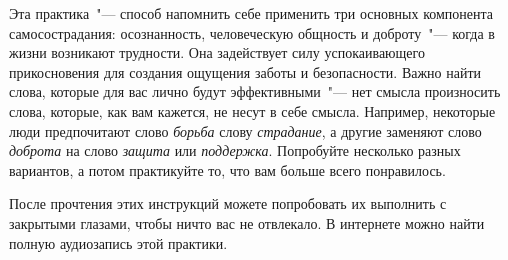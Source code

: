 \newpage
{} \label{IP:Self-Compassion_Break}

Эта практика~"--- способ напомнить себе применить три основных компонента самосострадания: осознанность, человеческую общность и доброту~"--- когда в жизни возникают трудности. Она задействует силу успокаивающего прикосновения для создания ощущения заботы и безопасности. Важно найти слова, которые для вас лично будут эффективными~"--- нет смысла произносить слова, которые, как вам кажется, не несут в себе смысла. Например, некоторые люди предпочитают слово \textit{борьба} слову \textit{страдание}, а другие заменяют слово \textit{доброта} на слово \textit{защита} или \textit{поддержка}. Попробуйте несколько разных вариантов, а потом практикуйте то, что вам больше всего понравилось. 

После прочтения этих инструкций можете попробовать их выполнить с закрытыми глазами, чтобы ничто вас не отвлекало. В интернете можно найти полную аудиозапись этой практики.

